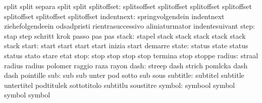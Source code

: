                            split                     split
                           separa                    split
                           split
              splitoffset: splitsoffset              splitoffset
                           splitoffset               splitoffset
                           splitoffset               splitoffset
                           splitoffset
               indentnext: springvolgendein          indentnext
                           ziehefolgendeein          odsadpristi
                           rientrasuccessivo         aliniaturmator
                           indentesuivant
                     step: stap                      step
                           schritt                   krok
                           passo                     pas
                           pas
                    stack: stapel                    stack
                           stack                     stack
                           stack                     stack
                           stack
                    start: start                     start
                           start                     start
                           inizia                    start
                           demarre
                    state: status                    state
                           status                    status
                           stato                     stare
                           etat
                     stop: stop                      stop
                           stop                      stop
                           termina                   stop
                           stoppe
                   radius: straal                    radius
                           radius                    polomer
                           raggio                    raza
                           rayon
                     dash: streep                    dash
                           strich                    pomlcka
                           dash                      dash
                           pointille
                      sub: sub                       sub
                           unter                     pod
                           sotto                     sub
                           sous
                 subtitle: subtitel                  subtitle
                           untertitel                podtitulek
                           sottotitolo               subtitlu
                           soustitre
                   symbol: symbool                   symbol
                           symbol                    symbol
